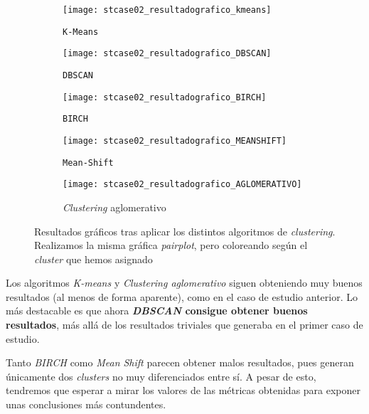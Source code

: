\documentclass[11pt]{article}
\begin{document}
\begin{figure}[H]
    \centering

    \begin{subfigure}[b]{0.45 \textwidth}
        \texttt{[image: stcase02\_resultadografico\_kmeans]}
        \caption{\lstinline{K-Means}}
    \end{subfigure}
    \begin{subfigure}[b]{0.45 \textwidth}
        \texttt{[image: stcase02\_resultadografico\_DBSCAN]}
        \caption{\lstinline{DBSCAN}}
    \end{subfigure}

    \begin{subfigure}[b]{0.45 \textwidth}
        \texttt{[image: stcase02\_resultadografico\_BIRCH]}
        \caption{\lstinline{BIRCH}}
    \end{subfigure}
    \begin{subfigure}[b]{0.45 \textwidth}
        \texttt{[image: stcase02\_resultadografico\_MEANSHIFT]}
        \caption{\lstinline{Mean-Shift}}
    \end{subfigure}

    \begin{subfigure}[b]{0.45 \textwidth}
        \texttt{[image: stcase02\_resultadografico\_AGLOMERATIVO]}
        \caption{\emph{Clustering} aglomerativo}
    \end{subfigure}


    \caption{Resultados gráficos tras aplicar los distintos algoritmos de \emph{clustering}. Realizamos la misma gráfica \emph{pairplot}, pero coloreando según el \emph{cluster} que hemos asignado}
    \label{stcase02_resultadosgraficos:figure}

\end{figure}

Los algoritmos \emph{K-means} y \emph{Clustering aglomerativo} siguen obteniendo muy buenos resultados (al menos de forma aparente), como en el caso de estudio anterior. Lo más destacable es que ahora \textbf{\emph{DBSCAN} consigue obtener buenos resultados}, más allá de los resultados triviales que generaba en el primer caso de estudio.

Tanto \emph{BIRCH} como \emph{Mean Shift} parecen obtener malos resultados, pues generan únicamente dos \emph{clusters} no muy diferenciados entre sí. A pesar de esto, tendremos que esperar a mirar los valores de las métricas obtenidas para exponer unas conclusiones más contundentes.
\end{document}
